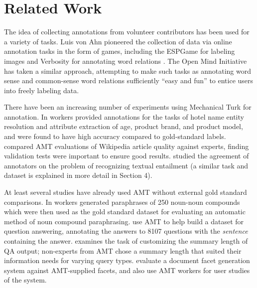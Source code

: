\documentclass[11pt]{article}
\begin{document}

\section{Related Work}

The idea of collecting annotations from volunteer contributors has been used for a variety
of tasks. Luis von Ahn pioneered the collection of data via online
annotation tasks in the form of games, including the ESPGame for
labeling images \cite{espgame} and Verbosity for annotating word
relations \cite{verbosity}.  The Open Mind Initiative \cite{OpenMind}
has taken a similar approach, attempting to make such tasks as
annotating word sense \cite{WordExpert} and common-sense word
relations \cite{OpenMindCommonSense} sufficiently ``easy and fun''
to entice users into freely labeling data.

There have been an increasing number of experiments using Mechanical
Turk for annotation.  In \cite{Su:07} workers provided annotations for the tasks of
hotel name entity resolution and attribute extraction of age, product brand, and
product model, and were found to have high accuracy compared to gold-standard labels.  
 compared AMT evaluations of Wikipedia article quality against experts, finding validation tests were important to ensure good results.
 studied the agreement of annotators
on the problem of recognizing textual entailment (a similar task
and dataset is explained in more detail in Section 4).

At least several studies have already used AMT without external gold standard comparisons.
In \cite{NakovLREC:08} workers generated paraphrases of 250 noun-noun compounds which were then used
as the gold standard dataset for evaluating an automatic method of noun compound paraphrasing.
 use AMT to help build a dataset for question answering, 
annotating the answers to 8107
questions with the \textit{sentence}
containing the answer.  
 examines the task of
customizing the summary length of QA output;
non-experts from AMT chose a summary length that suited their information needs for varying
query types.  
 evaluate a document facet generation system against AMT-supplied facets, and also use AMT workers for user studies of the system.
\end{document}
